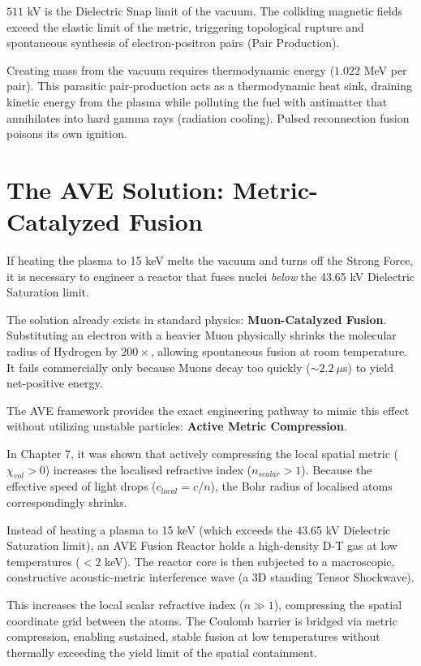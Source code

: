 $511$ kV is the Dielectric Snap limit of the vacuum. The colliding magnetic fields exceed the elastic limit of the metric, triggering topological rupture and spontaneous synthesis of electron-positron pairs (Pair Production). 

Creating mass from the vacuum requires thermodynamic energy ($1.022$ MeV per pair). This parasitic pair-production acts as a thermodynamic heat sink, draining kinetic energy from the plasma while polluting the fuel with antimatter that annihilates into hard gamma rays (radiation cooling). Pulsed reconnection fusion poisons its own ignition.

\section{The AVE Solution: Metric-Catalyzed Fusion}
If heating the plasma to 15 keV melts the vacuum and turns off the Strong Force, it is necessary to engineer a reactor that fuses nuclei \textit{below} the 43.65 kV Dielectric Saturation limit.

The solution already exists in standard physics: \textbf{Muon-Catalyzed Fusion}. Substituting an electron with a heavier Muon physically shrinks the molecular radius of Hydrogen by $200\times$, allowing spontaneous fusion at room temperature. It fails commercially only because Muons decay too quickly ($\sim 2.2 \ \mu$s) to yield net-positive energy.

The AVE framework provides the exact engineering pathway to mimic this effect without utilizing unstable particles: \textbf{Active Metric Compression}.

In Chapter 7, it was shown that actively compressing the local spatial metric ($\chi_{vol} > 0$) increases the localised refractive index ($n_{scalar} > 1$). Because the effective speed of light drops ($c_{local} = c/n$), the Bohr radius of localised atoms correspondingly shrinks.

Instead of heating a plasma to 15 keV (which exceeds the 43.65 kV Dielectric Saturation limit), an AVE Fusion Reactor holds a high-density D-T gas at low temperatures ($< 2$ keV). The reactor core is then subjected to a macroscopic, constructive acoustic-metric interference wave (a 3D standing Tensor Shockwave). 

This increases the local scalar refractive index ($n \gg 1$), compressing the spatial coordinate grid between the atoms. The Coulomb barrier is bridged via metric compression, enabling sustained, stable fusion at low temperatures without thermally exceeding the yield limit of the spatial containment.

